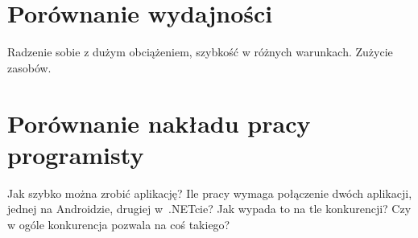 
\section{Porównanie wydajności}
Radzenie sobie z dużym obciążeniem, szybkość w różnych warunkach. Zużycie zasobów.

\section{Porównanie nakładu pracy programisty}
Jak szybko można zrobić aplikację? Ile pracy wymaga połączenie dwóch aplikacji, jednej na Androidzie, drugiej w~.NETcie? Jak wypada to na tle konkurencji? Czy w ogóle konkurencja pozwala na coś takiego?